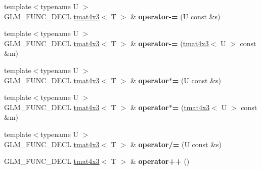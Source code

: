 \begin{DoxyCompactItemize}
\item 
\hypertarget{structglm_1_1detail_1_1tmat4x3_a4855832df75e14908ec7e579e8a36fa7}{}{\footnotesize template$<$typename U $>$ }\\G\+L\+M\+\_\+\+F\+U\+N\+C\+\_\+\+D\+E\+C\+L \hyperlink{structglm_1_1detail_1_1tmat4x3}{tmat4x3}$<$ T $>$ \& {\bfseries operator-\/=} (U const \&s)\label{structglm_1_1detail_1_1tmat4x3_a4855832df75e14908ec7e579e8a36fa7}

\item 
\hypertarget{structglm_1_1detail_1_1tmat4x3_aa1cbe37238954809993e6a308e61d5a1}{}{\footnotesize template$<$typename U $>$ }\\G\+L\+M\+\_\+\+F\+U\+N\+C\+\_\+\+D\+E\+C\+L \hyperlink{structglm_1_1detail_1_1tmat4x3}{tmat4x3}$<$ T $>$ \& {\bfseries operator-\/=} (\hyperlink{structglm_1_1detail_1_1tmat4x3}{tmat4x3}$<$ U $>$ const \&m)\label{structglm_1_1detail_1_1tmat4x3_aa1cbe37238954809993e6a308e61d5a1}

\item 
\hypertarget{structglm_1_1detail_1_1tmat4x3_ad3ab4a6247aeb3a8c2bdcce184eb41a1}{}{\footnotesize template$<$typename U $>$ }\\G\+L\+M\+\_\+\+F\+U\+N\+C\+\_\+\+D\+E\+C\+L \hyperlink{structglm_1_1detail_1_1tmat4x3}{tmat4x3}$<$ T $>$ \& {\bfseries operator$\ast$=} (U const \&s)\label{structglm_1_1detail_1_1tmat4x3_ad3ab4a6247aeb3a8c2bdcce184eb41a1}

\item 
\hypertarget{structglm_1_1detail_1_1tmat4x3_a21b6f431334fa33c0e1b7ed32ff0d1b5}{}{\footnotesize template$<$typename U $>$ }\\G\+L\+M\+\_\+\+F\+U\+N\+C\+\_\+\+D\+E\+C\+L \hyperlink{structglm_1_1detail_1_1tmat4x3}{tmat4x3}$<$ T $>$ \& {\bfseries operator$\ast$=} (\hyperlink{structglm_1_1detail_1_1tmat4x3}{tmat4x3}$<$ U $>$ const \&m)\label{structglm_1_1detail_1_1tmat4x3_a21b6f431334fa33c0e1b7ed32ff0d1b5}

\item 
\hypertarget{structglm_1_1detail_1_1tmat4x3_a0e5434b55efa8b7ec3dcb01d7cb28f1c}{}{\footnotesize template$<$typename U $>$ }\\G\+L\+M\+\_\+\+F\+U\+N\+C\+\_\+\+D\+E\+C\+L \hyperlink{structglm_1_1detail_1_1tmat4x3}{tmat4x3}$<$ T $>$ \& {\bfseries operator/=} (U const \&s)\label{structglm_1_1detail_1_1tmat4x3_a0e5434b55efa8b7ec3dcb01d7cb28f1c}

\item 
\hypertarget{structglm_1_1detail_1_1tmat4x3_a38ac70839201809f248c35b5cc5d8756}{}G\+L\+M\+\_\+\+F\+U\+N\+C\+\_\+\+D\+E\+C\+L \hyperlink{structglm_1_1detail_1_1tmat4x3}{tmat4x3}$<$ T $>$ \& {\bfseries operator++} ()\label{structglm_1_1detail_1_1tmat4x3_a38ac70839201809f248c35b5cc5d8756}


\end{DoxyCompactItemize}
